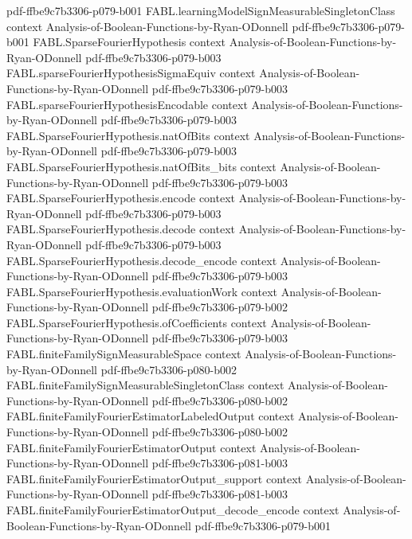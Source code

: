 \begin{theorem}
  {pdf-ffbe9c7b3306-p079-b001}
\proofstep
  {FABL.learningModelSignMeasurableSingletonClass}
  {context}
  {Analysis-of-Boolean-Functions-by-Ryan-ODonnell}
  {pdf-ffbe9c7b3306-p079-b001}
\proofstep
  {FABL.SparseFourierHypothesis}
  {context}
  {Analysis-of-Boolean-Functions-by-Ryan-ODonnell}
  {pdf-ffbe9c7b3306-p079-b003}
\proofstep
  {FABL.sparseFourierHypothesisSigmaEquiv}
  {context}
  {Analysis-of-Boolean-Functions-by-Ryan-ODonnell}
  {pdf-ffbe9c7b3306-p079-b003}
\proofstep
  {FABL.sparseFourierHypothesisEncodable}
  {context}
  {Analysis-of-Boolean-Functions-by-Ryan-ODonnell}
  {pdf-ffbe9c7b3306-p079-b003}
\proofstep
  {FABL.SparseFourierHypothesis.natOfBits}
  {context}
  {Analysis-of-Boolean-Functions-by-Ryan-ODonnell}
  {pdf-ffbe9c7b3306-p079-b003}
\proofstep
  {FABL.SparseFourierHypothesis.natOfBits_bits}
  {context}
  {Analysis-of-Boolean-Functions-by-Ryan-ODonnell}
  {pdf-ffbe9c7b3306-p079-b003}
\proofstep
  {FABL.SparseFourierHypothesis.encode}
  {context}
  {Analysis-of-Boolean-Functions-by-Ryan-ODonnell}
  {pdf-ffbe9c7b3306-p079-b003}
\proofstep
  {FABL.SparseFourierHypothesis.decode}
  {context}
  {Analysis-of-Boolean-Functions-by-Ryan-ODonnell}
  {pdf-ffbe9c7b3306-p079-b003}
\proofstep
  {FABL.SparseFourierHypothesis.decode_encode}
  {context}
  {Analysis-of-Boolean-Functions-by-Ryan-ODonnell}
  {pdf-ffbe9c7b3306-p079-b003}
\proofstep
  {FABL.SparseFourierHypothesis.evaluationWork}
  {context}
  {Analysis-of-Boolean-Functions-by-Ryan-ODonnell}
  {pdf-ffbe9c7b3306-p079-b002}
\proofstep
  {FABL.SparseFourierHypothesis.ofCoefficients}
  {context}
  {Analysis-of-Boolean-Functions-by-Ryan-ODonnell}
  {pdf-ffbe9c7b3306-p079-b003}
\proofstep
  {FABL.finiteFamilySignMeasurableSpace}
  {context}
  {Analysis-of-Boolean-Functions-by-Ryan-ODonnell}
  {pdf-ffbe9c7b3306-p080-b002}
\proofstep
  {FABL.finiteFamilySignMeasurableSingletonClass}
  {context}
  {Analysis-of-Boolean-Functions-by-Ryan-ODonnell}
  {pdf-ffbe9c7b3306-p080-b002}
\proofstep
  {FABL.finiteFamilyFourierEstimatorLabeledOutput}
  {context}
  {Analysis-of-Boolean-Functions-by-Ryan-ODonnell}
  {pdf-ffbe9c7b3306-p080-b002}
\proofstep
  {FABL.finiteFamilyFourierEstimatorOutput}
  {context}
  {Analysis-of-Boolean-Functions-by-Ryan-ODonnell}
  {pdf-ffbe9c7b3306-p081-b003}
\proofstep
  {FABL.finiteFamilyFourierEstimatorOutput_support}
  {context}
  {Analysis-of-Boolean-Functions-by-Ryan-ODonnell}
  {pdf-ffbe9c7b3306-p081-b003}
\proofstep
  {FABL.finiteFamilyFourierEstimatorOutput_decode_encode}
  {context}
  {Analysis-of-Boolean-Functions-by-Ryan-ODonnell}
  {pdf-ffbe9c7b3306-p079-b001}
\proofstep

\end{theorem}
